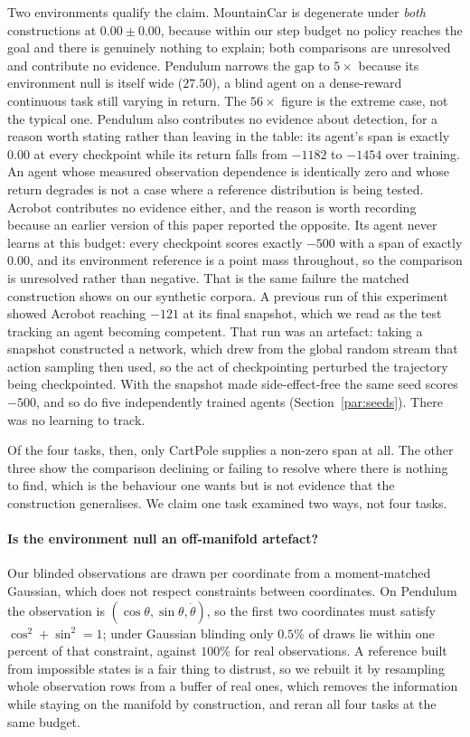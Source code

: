 \documentclass[10pt,twocolumn]{article}
\newcommand{\elsewhere}[1]{Section~\ref{#1}}
\begin{document}
Two environments qualify the claim. MountainCar is degenerate under \emph{both}
constructions at $0.00 \pm 0.00$, because within our step budget no policy
reaches the goal and there is genuinely nothing to explain; both comparisons are
unresolved and contribute no evidence. Pendulum narrows the gap to $5\times$
because its environment null is itself wide ($27.50$), a blind agent on a
dense-reward continuous task still varying in return. The $56\times$ figure is
the extreme case, not the typical one. Pendulum also contributes no evidence
about detection, for a reason worth stating rather than leaving in the table:
its agent's span is exactly $0.00$ at every checkpoint while its return falls
from $-1182$ to $-1454$ over training. An agent whose measured observation
dependence is identically zero and whose return degrades is not a case where a
reference distribution is being tested. Acrobot contributes no evidence either, and the reason is worth recording
because an earlier version of this paper reported the opposite. Its agent never
learns at this budget: every checkpoint scores exactly $-500$ with a span of
exactly $0.00$, and its environment reference is a point mass throughout, so the
comparison is unresolved rather than negative. That is the same failure the
matched construction shows on our synthetic corpora. A previous run of this
experiment showed Acrobot reaching $-121$ at its final snapshot, which we read as
the test tracking an agent becoming competent. That run was an artefact: taking a
snapshot constructed a network, which drew from the global random stream that
action sampling then used, so the act of checkpointing perturbed the trajectory
being checkpointed. With the snapshot made side-effect-free the same seed scores
$-500$, and so do five independently trained agents (\elsewhere{par:seeds}).
There was no learning to track.

Of the four tasks, then, only CartPole supplies a non-zero span at all. The other
three show the comparison declining or failing to resolve where there is nothing
to find, which is the behaviour one wants but is not evidence that the
construction generalises. We claim one task examined two ways, not four tasks.

\paragraph{Is the environment null an off-manifold artefact?}
Our blinded observations are drawn per coordinate from a moment-matched
Gaussian, which does not respect constraints between coordinates. On Pendulum
the observation is $(\cos\theta, \sin\theta, \dot\theta)$, so the first two
coordinates must satisfy $\cos^2 + \sin^2 = 1$; under Gaussian blinding only
$0.5\%$ of draws lie within one percent of that constraint, against $100\%$ for
real observations. A reference built from impossible states is a fair thing to
distrust, so we rebuilt it by resampling whole observation rows from a buffer of
real ones, which removes the information while staying on the manifold by
construction, and reran all four tasks at the same budget.
\end{document}
